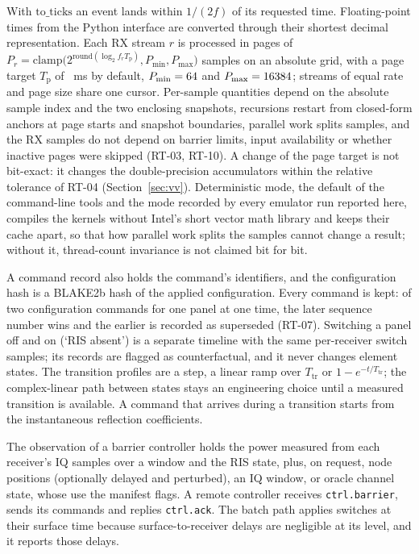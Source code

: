 With $\mathrm{to\_ticks}$ an event lands within $1/(2f)$ of its requested
time. Floating-point times from the Python interface are converted through their
shortest decimal representation. Each RX stream $r$ is processed in pages
of $P_r=\mathrm{clamp}\bigl(2^{\mathrm{round}(\log_2 f_rT_{\mathrm p})},P_{\min},P_{\max}\bigr)$
samples on an absolute grid, with a page target $T_{\mathrm p}$ of \numPageTargetMs~ms by
default, $P_{\min}=64$ and $P_{\max}=16384$; streams of equal rate and page size
share one cursor. Per-sample quantities depend on the absolute sample index and the two
enclosing snapshots, recursions restart from closed-form anchors at page starts and snapshot
boundaries, parallel work splits samples, and the RX samples do not depend on barrier limits,
input availability or whether inactive pages were skipped (RT-03, RT-10). A change of the page target is not bit-exact: it changes the double-precision
accumulators within the relative tolerance of RT-04 (Section~\ref{sec:vv}). Deterministic
mode, the default of the command-line tools and the mode recorded by every emulator run reported here,
compiles the kernels without Intel's short vector math library and keeps their cache apart, so
that how parallel work splits the samples cannot change a result; without it, thread-count
invariance is not claimed bit for bit.

A command record also holds the command's identifiers, and the
configuration hash is a BLAKE2b hash of the applied configuration.
Every command is kept: of two configuration commands for one panel at one time,
the later sequence number wins and the earlier is recorded as superseded (RT-07).
Switching a panel off and on (`RIS absent') is a
separate timeline with the same per-receiver switch samples; its records are flagged as
counterfactual, and it never changes element states. The transition
profiles are a step, a linear ramp over $T_{\mathrm{tr}}$ or $1-e^{-t/T_{\mathrm{tr}}}$; the complex-linear path
between states stays an engineering choice until a measured transition is available. A command
that arrives during a transition starts from the instantaneous reflection coefficients.

The observation of a barrier controller holds the power measured from each
receiver's IQ samples over a window and the RIS state, plus, on request, node positions
(optionally delayed and perturbed), an IQ window, or oracle channel state, whose use the
manifest flags. A remote controller receives \texttt{ctrl.barrier}, sends its commands and
replies \texttt{ctrl.ack}. The batch path applies switches at their surface time
because surface-to-receiver delays are negligible at its level, and it reports those delays.

